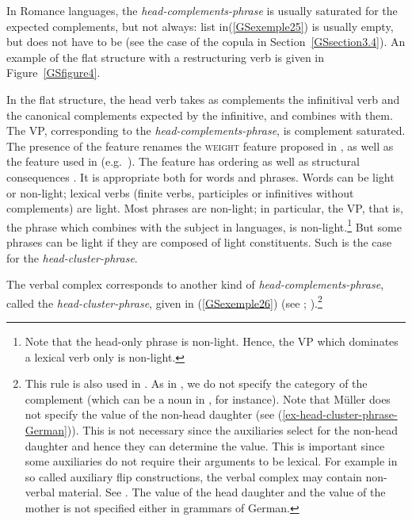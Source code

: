 In Romance languages, the \emph{head-complements-phrase} is usually saturated for the expected
complements, but not always: list  in(\ref{GSexemple25}) is usually empty, but does not have
to be (see the case of the copula in Section~\ref{GSsection3.4}). An example of the flat structure
with a restructuring verb is given in Figure~\ref{GSfigure4}.

\largerpage[2]
In the flat structure, the head verb takes as complements the infinitival verb and the canonical
complements expected by the infinitive, and combines with them. The VP, corresponding to the
\emph{head-complements-phrase}, is complement saturated. The presence of the \light feature
\citep{bonami2012phrase} renames the \textsc{weight} feature proposed in ,
as well as the \lex feature used in  (e.g.\ \citealt{HN89b, HN94a, Kiss95a,
  Meurers2000b, Mueller2002b, hohle2018spuren}). The \light feature has ordering as well as
structural consequences \citep{abeille2000french, AG2010}. It is appropriate both for words and
phrases. Words can be light or non-light; lexical verbs (finite verbs, participles or infinitives
without complements) are light. Most phrases are non-light; in particular, the VP, that is, the
phrase which combines with the subject in  languages, is non-light.\footnote{Note that
  the head-only phrase is non-light. Hence, the VP which dominates a lexical verb only is
  non-light.} But some phrases can be light if they are composed of light constituents. Such is the
case for the \emph{head-cluster-phrase}.

The verbal complex corresponds to another kind of \emph{head-complements-phrase}, called the
\emph{head-cluster-phrase}, given in (\ref{GSexemple26}) (see \citealt[87]{Mueller2002b};
\citealt[39]{muller2018clause}).\footnote{This rule is also used in . As in
  , we do not specify the category of the complement (which can be a noun in
  , for instance). Note that Müller does not specify the \light value of the non-head
  daughter (see (\ref{ex-head-cluster-phrase-German})). This is not necessary since the auxiliaries select for the non-head daughter and hence
  they can determine the \light value. This is important since some auxiliaries do not require
  their arguments to be lexical. For example in so called auxiliary flip constructions, the verbal
  complex may contain non-verbal material. See . The \light value of the
head daughter and the \light value of the mother is not specified either in grammars of German. } 

